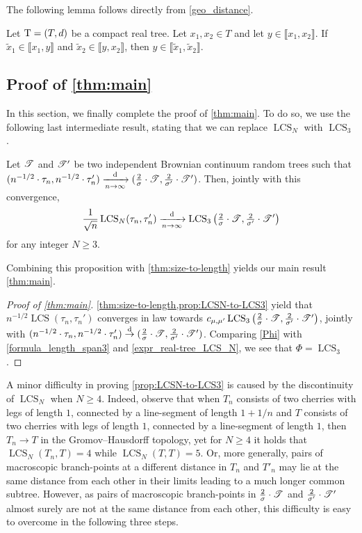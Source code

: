 \documentclass[11pt,reqno]{amsart}
\newcommand{\LCS}{\operatorname{LCS}}
\begin{document}
The following lemma follows directly from \eqref{geo_distance}. 
\begin{lem}
\label{5points_1path} 
Let $\mathrm{T}=(T,d)$ be a compact real tree. Let $x_1,x_2\in T$ and let $y\in\llbracket x_1,x_2\rrbracket$. If $\tilde{x}_1\in\llbracket x_1,y\rrbracket$ and $\tilde{x}_2\in \llbracket y,x_2\rrbracket$, then $y\in\llbracket \tilde{x}_1,\tilde{x}_2\rrbracket$.
\end{lem}

\subsection{Proof of \cref{thm:main}}\label{sec:proof_main} In this section, we finally complete the proof of \cref{thm:main}. To do so, we use the following last intermediate result, stating that we can replace $\LCS_N$ with $\LCS_3$.


\begin{prop}\label{prop:LCSN-to-LCS3}
    Let $\mathscr{T}$ and $\mathscr{T}'$ be two independent Brownian continuum random trees such that $(n^{-1/2}\cdot\tau_n,n^{-1/2}\cdot\tau_n') \xrightarrow[n\to\infty]{\mathrm d}  (\frac{2}{\sigma}\cdot\mathscr{T}, \frac{2}{\sigma'}\cdot\mathscr{T}')$. Then, jointly with this convergence,
\[\frac{1}{\sqrt{n}}\LCS_N(\tau_n,\tau_n') \xrightarrow[n\to\infty]{\mathrm d} \LCS_3\big(\tfrac{2}{\sigma}\cdot \sT,\tfrac{2}{\sigma'}\cdot \sT'\big)\] 
for any integer $N\geq 3$. 
\end{prop}

Combining this proposition with \cref{thm:size-to-length} yields our main result \cref{thm:main}.

\begin{proof}[Proof of \cref{thm:main}]
     \cref{thm:size-to-length,prop:LCSN-to-LCS3} yield that $n^{-1/2}\LCS(\tau_n,\tau_n')$ converges in law towards $c_{\mu,\mu'}\LCS_3\big(\tfrac{2}{\sigma}\cdot \sT,\tfrac{2}{\sigma'}\cdot \sT'\big)$, jointly with $(n^{-1/2}\cdot\tau_n,n^{-1/2}\cdot\tau_n') \stackrel{\mathrm{d}}{\rightarrow} (\frac{2}{\sigma}\cdot\mathscr{T}, \frac{2}{\sigma'}\cdot\mathscr{T}')$. Comparing \eqref{Phi} with \eqref{formula_length_span3} and \eqref{expr_real-tree_LCS_N}, we see that $\Phi = \LCS_3$.
\end{proof}

A minor difficulty in proving \cref{prop:LCSN-to-LCS3} is caused by the discontinuity of $\LCS_N$ when $N\geq 4$. Indeed, observe that when $T_n$ consists of two cherries with legs of length $1$, connected by a line-segment of length $1+1/n$ and $T$ consists of two cherries with legs of length $1$, connected by a line-segment of length $1$, then $T_n\to T$ in the Gromov--Hausdorff topology, yet for $N\ge 4$ it holds that $\LCS_N(T_n,T)=4$ while $\LCS_N(T,T)=5$. Or, more generally, pairs of macroscopic branch-points at a different distance in $T_n$ and $T'_n$ may lie at the same distance from each other in their limits leading to a much longer common subtree. However, as pairs of macroscopic branch-points in $\frac{2}{\sigma}\cdot\mathscr{T}$ and $\frac{2}{\sigma'}\cdot\mathscr{T}'$ almost surely are not at the same distance from each other, this difficulty is easy to overcome in the following three steps.
\end{document}
